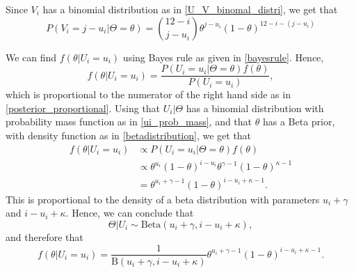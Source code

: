 Since $V_i$ has a binomial distribution as in \eqref{U_V_binomal_distri}, we get that
\begin{equation}
\label{vi_equal_j_minus_ui}
    P(V_i=j-u_i|\Theta=\theta)=\binom{12-i}{j-u_i}\theta^{j-u_i}(1-\theta)^{12-i-(j-u_i)}
\end{equation}


We can find $f(\theta| U_i=u_i)$ using Bayes rule as given in \eqref{bayesrule}. Hence,
\begin{equation*}
    f(\theta| U_i=u_i) = \frac{P(U_i=u_i|\Theta=\theta)f(\theta)}{P(U_i=u_i)},
\end{equation*}
which is proportional to the numerator of the right hand side as in \eqref{posterior_proportional}. Using that $U_i|\Theta$ has a binomial distribution with probability mass function as in \eqref{ui_prob_mass}, and that $\theta$ has a Beta prior, with density function as in \eqref{betadistribution}, we get that
\begin{equation*}
    \begin{aligned}
        f(\theta|U_i=u_i) 
        &\propto P(U_i=u_i|\Theta=\theta)f(\theta)\\[6pt] 
        &\propto \theta^{u_i}(1-\theta)^{i-u_i}\theta^{\gamma-1}(1-\theta)^{\kappa-1}\\[6pt]
        &= \theta^{u_i+\gamma-1}(1-\theta)^{i-u_i+\kappa-1}.
    \end{aligned}
\end{equation*}
This is proportional to the density of a beta distribution with parameters $u_i+\gamma$ and $i-u_i+\kappa$. Hence, we can conclude that
\begin{equation*}
    \Theta|U_i \sim \text{Beta}(u_i+\gamma,i-u_i+\kappa),
\end{equation*}
and therefore that 
\begin{equation}
\label{theta_given_ui}
    f(\theta|U_i=u_i) = \frac{1}{\text{B}(u_i+\gamma,i-u_i+\kappa)}\theta^{u_i+\gamma-1}(1-\theta)^{i-u_i+\kappa-1}.
\end{equation}

